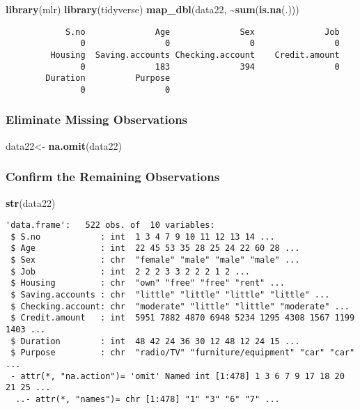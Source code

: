 \documentclass[
]{article}
\newenvironment{Shaded}{\begin{snugshade}}{\end{snugshade}}
\newcommand{\FunctionTok}[1]{\textcolor[rgb]{0.13,0.29,0.53}{\textbf{#1}}}
\newcommand{\NormalTok}[1]{#1}
\newcommand{\OtherTok}[1]{\textcolor[rgb]{0.56,0.35,0.01}{#1}}
\newcommand{\SpecialCharTok}[1]{\textcolor[rgb]{0.81,0.36,0.00}{\textbf{#1}}}
\begin{document}
\begin{Shaded}
\begin{Highlighting}[]
\FunctionTok{library}\NormalTok{(mlr)}
\FunctionTok{library}\NormalTok{(tidyverse)}
\FunctionTok{map\_dbl}\NormalTok{(data22, }\SpecialCharTok{\textasciitilde{}}\FunctionTok{sum}\NormalTok{(}\FunctionTok{is.na}\NormalTok{(.)))}
\end{Highlighting}
\end{Shaded}

\begin{verbatim}
            S.no              Age              Sex              Job 
               0                0                0                0 
         Housing  Saving.accounts Checking.account    Credit.amount 
               0              183              394                0 
        Duration          Purpose 
               0                0 
\end{verbatim}

\hypertarget{eliminate-missing-observations}{%
\subsubsection{Eliminate Missing
Observations}\label{eliminate-missing-observations}}

\begin{Shaded}
\begin{Highlighting}[]
\NormalTok{data22}\OtherTok{\textless{}{-}} \FunctionTok{na.omit}\NormalTok{(data22)}
\end{Highlighting}
\end{Shaded}

\hypertarget{confirm-the-remaining-observations}{%
\subsubsection{Confirm the Remaining
Observations}\label{confirm-the-remaining-observations}}

\begin{Shaded}
\begin{Highlighting}[]
\FunctionTok{str}\NormalTok{(data22)}
\end{Highlighting}
\end{Shaded}

\begin{verbatim}
'data.frame':   522 obs. of  10 variables:
 $ S.no            : int  1 3 4 7 9 10 11 12 13 14 ...
 $ Age             : int  22 45 53 35 28 25 24 22 60 28 ...
 $ Sex             : chr  "female" "male" "male" "male" ...
 $ Job             : int  2 2 2 3 3 2 2 2 1 2 ...
 $ Housing         : chr  "own" "free" "free" "rent" ...
 $ Saving.accounts : chr  "little" "little" "little" "little" ...
 $ Checking.account: chr  "moderate" "little" "little" "moderate" ...
 $ Credit.amount   : int  5951 7882 4870 6948 5234 1295 4308 1567 1199 1403 ...
 $ Duration        : int  48 42 24 36 30 12 48 12 24 15 ...
 $ Purpose         : chr  "radio/TV" "furniture/equipment" "car" "car" ...
 - attr(*, "na.action")= 'omit' Named int [1:478] 1 3 6 7 9 17 18 20 21 25 ...
  ..- attr(*, "names")= chr [1:478] "1" "3" "6" "7" ...
\end{verbatim}
\end{document}
